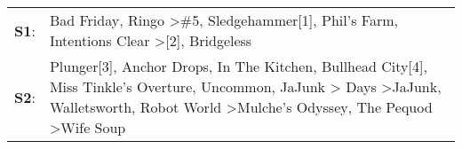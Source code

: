 \begin{supertabular}{p{0.03\textwidth}p{0.92\textwidth}}
 \textbf{S1}:  &                                                                                                                                                                                                                                                                                          Bad Friday\textsuperscript{}, \enspace Ringo\textsuperscript{} \textgreater \enspace \#5\textsuperscript{}, \enspace Sledgehammer[1]\textsuperscript{}, \enspace Phil's Farm\textsuperscript{}, \enspace Intentions Clear\textsuperscript{} \textgreater {}[2]\textsuperscript{}, \enspace Bridgeless\textsuperscript{}  \enspace  \\
 \textbf{S2}:  &  Plunger[3]\textsuperscript{}, \enspace Anchor Drops\textsuperscript{}, \enspace In The Kitchen\textsuperscript{}, \enspace Bullhead City[4]\textsuperscript{}, \enspace Miss Tinkle's Overture\textsuperscript{}, \enspace Uncommon\textsuperscript{}, \enspace JaJunk\textsuperscript{} \textgreater {} Days\textsuperscript{} \textgreater \enspace JaJunk\textsuperscript{}, \enspace Walletsworth\textsuperscript{}, \enspace Robot World\textsuperscript{} \textgreater \enspace Mulche's Odyssey\textsuperscript{}, \enspace The Pequod\textsuperscript{} \textgreater \enspace Wife Soup\textsuperscript{}  \enspace  \\
\end{supertabular}
